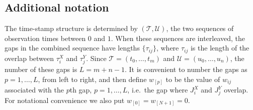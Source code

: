 \subsection{Additional notation}
The time-stamp structure is determined by $(\mathcal{T},\mathcal{U})$, the two sequences of observation times between $0$ and $1$.  When these sequences are interleaved, the gaps in the combined sequence have lengths $\{\tau_{ij}\}$, where $\tau_{ij}$ is the length of the overlap between $\tau_i^X$ and $\tau^Y_j$.  Since $\mathcal{T} = (t_0,\dots,t_m)$ and $\mathcal{U} = (u_0,\dots,u_n)$, the number of these gaps is $L=m+n-1$. It is convenient to number the gaps as $p = 1,\dots,L$, from left to right, and then define  $w_{[p]}$ to be the value of $w_{ij}$ associated with the $p$th gap, $ p = 1,\dots,L$, i.e.\ the gap where $J^X_i$ and $J^Y_j$ overlap. For notational convenience we also put $w_{[0]} = w_{[N+1]} = 0$.

